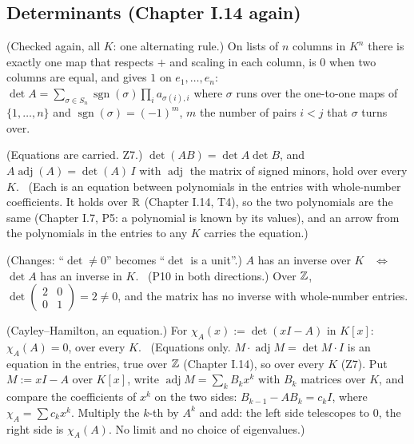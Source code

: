 \subsection*{Determinants (Chapter I.14 again)}

\begin{lines}
\item[\lab{P9}] (Checked again, all $K$: one alternating rule.) On lists of $n$ columns in $K^n$ there is exactly one map that respects $+$ and scaling in each column, is $0$ when two columns are equal, and gives $1$ on $e_1, \dots, e_n$: \ $\det A = \sum_{\sigma \in S_n} \operatorname{sgn}(\sigma) \prod_i a_{\sigma(i), i}$ where $\sigma$ runs over the one-to-one maps of $\{1, \dots, n\}$ and $\operatorname{sgn}(\sigma) = (-1)^{m}$, $m$ the number of pairs $i < j$ that $\sigma$ turns over.
\item[\lab{P10}] (Equations are carried. Z7.) $\det(AB) = \det A \det B$, and $A \operatorname{adj}(A) = \det(A)\, I$ with $\operatorname{adj}$ the matrix of signed minors, hold over every $K$. \ (Each is an equation between polynomials in the entries with whole-number coefficients. It holds over $\mathbb{R}$ (Chapter I.14, T4), so the two polynomials are the same (Chapter I.7, P5: a polynomial is known by its values), and an arrow from the polynomials in the entries to any $K$ carries the equation.)
\item[\lab{P11}] (Changes: ``$\det \ne 0$'' becomes ``$\det$ is a unit''.) $A$ has an inverse over $K$ \ $\iff$ \ $\det A$ has an inverse in $K$. \ (P10 in both directions.) Over $\mathbb{Z}$, $\det \begin{pmatrix} 2 & 0 \\ 0 & 1 \end{pmatrix} = 2 \ne 0$, and the matrix has no inverse with whole-number entries.
\item[\lab{P12}] (Cayley--Hamilton, an equation.) For $\chi_A(x) := \det(xI - A)$ in $K[x]$: $\chi_A(A) = 0$, over every $K$. \ (Equations only. $M \cdot \operatorname{adj} M = \det M \cdot I$ is an equation in the entries, true over $\mathbb{Z}$ (Chapter I.14), so over every $K$ (Z7). Put $M := xI - A$ over $K[x]$, write $\operatorname{adj} M = \sum_k B_k x^k$ with $B_k$ matrices over $K$, and compare the coefficients of $x^k$ on the two sides: $B_{k-1} - A B_k = c_k I$, where $\chi_A = \sum c_k x^k$. Multiply the $k$-th by $A^k$ and add: the left side telescopes to $0$, the right side is $\chi_A(A)$. No limit and no choice of eigenvalues.)
\end{lines}

